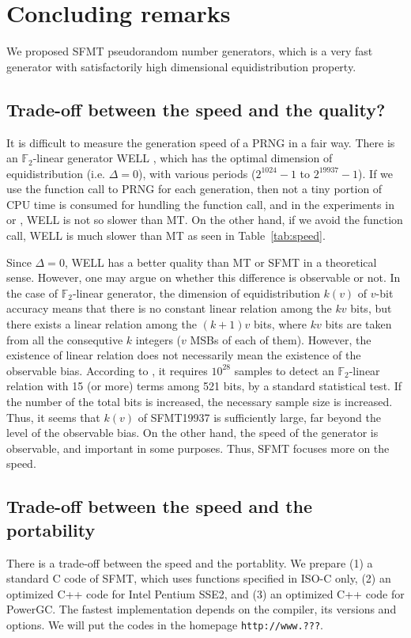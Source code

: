 \documentclass[acmnow]{acmtrans2m}
\def\F2{{\mathbb F}_2}
\begin{document}
\section{Concluding remarks}
We proposed SFMT pseudorandom number generators, 
which is a very fast generator with satisfactorily
high dimensional equidistribution property. 

\subsection{Trade-off between the speed and the quality?}
It is difficult to measure the generation speed of a PRNG in a fair way. 
There is an $\F2$-linear generator 
WELL \cite{WELL}, which has the optimal dimension of 
equidistribution (i.e. $\Delta=0$), 
with various periods ($2^{1024}-1$ to $2^{19937}-1$).
If we use the function call to PRNG
for each generation, then not a tiny portion of CPU time
is consumed for hundling the function call, and in the 
experiments in \cite{WELL} or \cite{XORSHIFT}, WELL 
is not so slower than MT. On the other hand, if we avoid
the function call, WELL is much slower than MT as seen
in Table~\ref{tab:speed}. 

Since $\Delta=0$, WELL has a better quality than MT or SFMT
in a theoretical sense. 
However, one may argue on whether this difference is 
observable or not. In the case of $\F2$-linear generator,
the dimension of equidistribution $k(v)$ of $v$-bit accuracy
means that
there is no constant linear relation among the 
$kv$ bits, but there exists a linear relation among
the $(k+1)v$ bits, where $kv$ bits are taken from
all the consequtive $k$ integers ($v$ MSBs of each of them). 
However, the existence of linear relation does not necessarily
mean the existence of the observable bias.
According to \cite{TESTWEIGHT}, it requires $10^{28}$
samples to detect an $\F2$-linear relation with 
15 (or more) terms among 521 bits, by a standard
statistical test. If the number of the 
total bits is increased, 
the necessary sample size is increased. Thus, it seems
that $k(v)$ of SFMT19937 is sufficiently large, far beyond
the level of the observable bias. 
On the other hand, the speed of the generator is 
observable, and important in some purposes. 
Thus, SFMT focuses more on the speed. 

\subsection{Trade-off between the speed and the portability}
There is a trade-off between the speed and the portablity.
We prepare (1) a standard C code of SFMT, which uses 
functions specified in ISO-C only, (2) an optimized C++ code for
Intel Pentium SSE2, and (3) an optimized C++ code for PowerGC. 
The fastest implementation depends on the compiler, its versions and
options. We will put the codes in the homepage {\tt http://www.???}.
\end{document}
